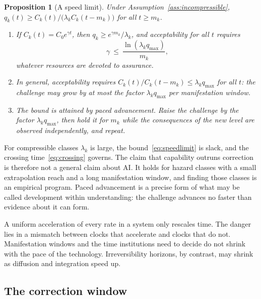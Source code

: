 \documentclass[11pt]{article}
\theoremstyle{plain}
\newtheorem{proposition}{Proposition}
\theoremstyle{definition}
\newcommand{\qmax}{q_{\max}}
\begin{document}
\begin{proposition}[A speed limit]\label{prop:speedlimit}
Under Assumption~\ref{ass:incompressible}, $q_k(t)\ge C_k(t)/\big(\lambda_kC_k(t-m_k)\big)$ for all $t\ge m_k$.
\begin{enumerate}[label=(\roman*),leftmargin=*]
\item If $C_k(t)=C_0e^{\gamma t}$, then $q_k\ge e^{\gamma m_k}/\lambda_k$, and acceptability for all $t$ requires
\begin{equation}\label{eq:speedlimit}
\gamma\ \le\ \frac{\ln(\lambda_k\qmax)}{m_k},
\end{equation}
whatever resources are devoted to assurance.
\item In general, acceptability requires $C_k(t)/C_k(t-m_k)\le\lambda_k\qmax$ for all $t$: the challenge may grow by at most the factor $\lambda_k\qmax$ per manifestation window.
\item The bound is attained by \emph{paced advancement}. Raise the challenge by the factor $\lambda_k\qmax$, then hold it for $m_k$ while the consequences of the new level are observed independently, and repeat.
\end{enumerate}
\end{proposition}

For compressible classes $\lambda_k$ is large, the bound~\eqref{eq:speedlimit} is slack, and the crossing time~\eqref{eq:crossing} governs. The claim that capability outruns correction is therefore not a general claim about AI. It holds for hazard classes with a small extrapolation reach and a long manifestation window, and finding those classes is an empirical program. Paced advancement is a precise form of what may be called development within understanding: the challenge advances no faster than evidence about it can form.

A uniform acceleration of every rate in a system only rescales time. The danger lies in a mismatch between clocks that accelerate and clocks that do not. Manifestation windows and the time institutions need to decide do not shrink with the pace of the technology. Irreversibility horizons, by contrast, may shrink as diffusion and integration speed up.

\subsection{The correction window}
\end{document}
